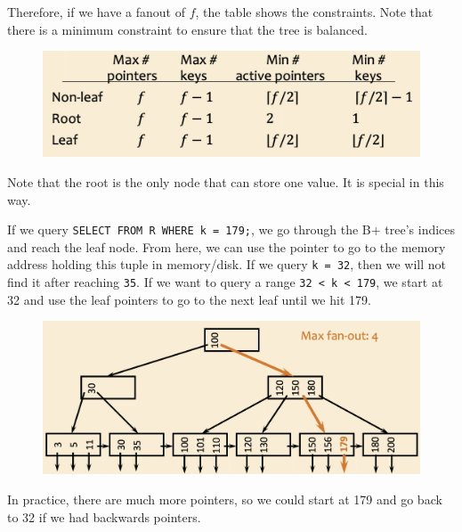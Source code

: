 \documentclass{article}
\begin{document}
\begin{definition}[B+ Tree]
      Therefore, if we have a fanout of $f$, the table shows the constraints. Note that there is a minimum constraint to ensure that the tree is balanced. 

      \begin{figure}[H]
        \centering 
        \includegraphics[scale=0.4]{img/chart.png}
        \caption{} 
        \label{fig:chart}
      \end{figure}

      Note that the root is the only node that can store one value. It is special in this way. 
    \end{definition}

    \begin{definition}[Lookup]
      If we query \texttt{SELECT \* FROM R WHERE k = 179;}, we go through the B+ tree's indices and reach the leaf node. From here, we can use the pointer to go to the memory address holding this tuple in memory/disk. If we query \texttt{k = 32}, then we will not find it after reaching \texttt{35}. If we want to query a range \texttt{32 < k < 179}, we start at 32 and use the leaf pointers to go to the next leaf until we hit 179. 

      \begin{figure}[H]
        \centering 
        \includegraphics[scale=0.4]{img/fanout_ex.png}
        \caption{} 
        \label{fig:fanout_ex}
      \end{figure}

      In practice, there are much more pointers, so we could start at 179 and go back to 32 if we had backwards pointers. 
    \end{definition}
\end{document}
